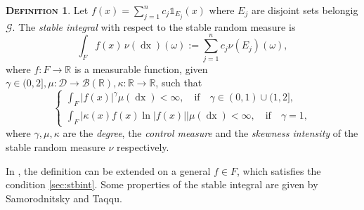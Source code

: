 \documentclass[a4paper, twoside, 11pt]{article}
\theoremstyle{definition}
\newtheorem{definition}{\scshape Definition}[section]
\begin{document}
  \begin{definition}
	Let $f(x) = \sum_{j=1}^n c_j \mathbb{1}_{E_j}(x)$ where $E_j$ are disjoint sets belongig $\mathscr{G}$. The \emph{stable integral} with respect to the stable random measure is  
  \begin{equation}
	\int_F f(x)\, \nu(\mathop{dx}) (\omega) := \sum_{j=1}^n c_j \nu(E_j) (\omega),
	\label{sec:stbint}
  \end{equation}
  where $f : F \rightarrow \mathbb{R}$ is a measurable function, given $\gamma\in (0, 2], \mu : \mathscr{D}\rightarrow \mathscr{B}(\mathbb{R}), \kappa: \mathbb{R}\rightarrow \mathbb{R}$, such that 
  \begin{equation}
  \begin{cases} \int_F |f(x)|^\gamma \mu(\mathop{dx}) < \infty,\hspace{1em} \text{if} \hspace{1em} \gamma \in (0, 1) \cup (1, 2],\\
	  \int_F |\kappa(x) f(x) \ln|f(x)||\mu(\mathop{dx}) < \infty,\hspace{1em} \text{if} \hspace{1em} \gamma = 1,
	\end{cases}
  \end{equation}
  where $\gamma, \mu , \kappa$ are the \emph{degree}, the \emph{control measure} and the \emph{skewness intensity} of the stable random measure $\nu$ respectively.
  \end{definition}
  In \cite{samorodnitsky}, the definition can be extended on a general $f \in F$, which satisfies the condition \ref{sec:stbint}. Some properties of the stable integral are given by Samorodnitsky and Taqqu.
\end{document}
